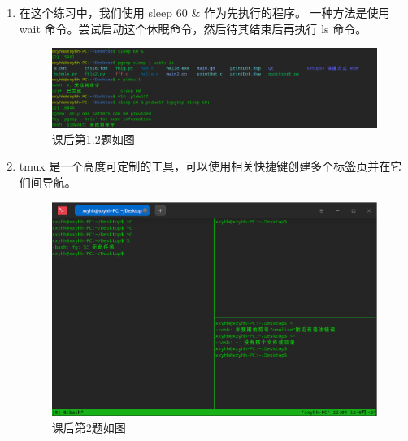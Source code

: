 \documentclass{ctexart}
\begin{document}
\begin{enumerate}
    \item 在这个练习中，我们使用 sleep 60 \& 作为先执行的程序。
    一种方法是使用 wait 命令。尝试启动这个休眠命令，然后待其结束后再执行 ls 命令。
    \begin{figure}[H]
        \centering
        \includegraphics[width=14cm]{f5b857233ad1ad2d039067550ba35c06.png}
        \caption{课后第1.2题如图}
        \label{fig:8}
    \end{figure}


\item tmux 是一个高度可定制的工具，可以使用相关快捷键创建多个标签页并在它们间导航。

\begin{figure}[H]
    \centering
    \includegraphics[width=14cm]{25ab931818a960c8606f757cf1b15eff.png}
    \caption{课后第2题如图}
    \label{fig:6}
\end{figure}


\end{enumerate}
\end{document}
